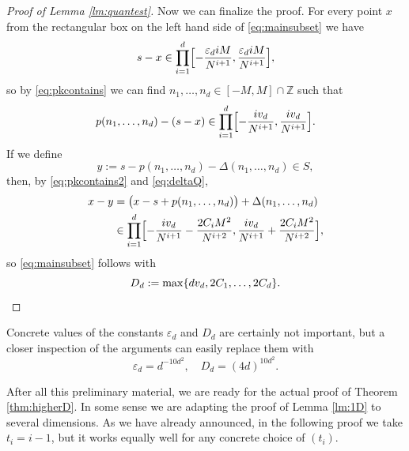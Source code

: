 \documentclass[11pt,letterpaper,reqno]{amsart}
\numberwithin{equation}{section}
\theoremstyle{definition}
\numberwithin{equation}{section}
\begin{document}
\begin{proof}[Proof of Lemma \ref{lm:quantest}]
Now we can finalize the proof.
For every point $x$ from the rectangular box on the left hand side of \eqref{eq:mainsubset} we have
\[ s-x\in \prod_{i=1}^{d} \Bigl[-\frac{\varepsilon_d i M}{N^{i+1}},\frac{\varepsilon_d i M}{N^{i+1}}\Bigr], \]
so by \eqref{eq:pkcontains} we can find $n_1,\ldots,n_d\in[-M,M]\cap\mathbb{Z}$ such that
\begin{equation}\label{eq:pkcontains2}
p(n_1,\ldots,n_d) - (s-x) \in \prod_{i=1}^{d} \Bigl[-\frac{i v_d}{N^{i+1}},\frac{i v_d}{N^{i+1}}\Bigr].
\end{equation}
If we define
\[ y := s - p(n_1,\ldots,n_d) - \Delta(n_1,\ldots,n_d) \in S, \]
then, by \eqref{eq:pkcontains2} and \eqref{eq:deltaQ},
\begin{align*}
x - y & = \big(x-s+p(n_1,\ldots,n_d)\big) + \Delta(n_1,\ldots,n_d) \\
& \in \prod_{i=1}^{d} \Bigl[ -\frac{i v_d}{N^{i+1}} -\frac{2C_i M^2}{N^{i+2}}, \frac{i v_d}{N^{i+1}} +\frac{2C_i M^2}{N^{i+2}} \Bigr],
\end{align*}
so \eqref{eq:mainsubset} follows with
\[  D_d := \max\{ d v_d, 2C_1, \ldots, 2C_d \}. \qedhere \]
\end{proof}

Concrete values of the constants $\varepsilon_d$ and $D_d$ are certainly not important, but a closer inspection of the arguments can easily replace them with
\[ \varepsilon_d = d^{-10d^2},\quad D_d = (4d)^{10d^2}. \]

After all this preliminary material, we are ready for the actual proof of Theorem \ref{thm:higherD}.
In some sense we are adapting the proof of Lemma \ref{lm:1D} to several dimensions.
As we have already announced, in the following proof we take $t_i=i-1$, but it works equally well for any concrete choice of $(t_i)$.
\end{document}
